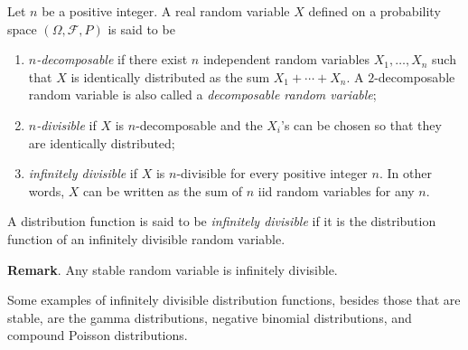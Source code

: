 \documentclass[12pt]{article}
\begin{document}
Let $n$ be a positive integer.  A real random variable $X$ defined on a probability space $(\Omega, \mathcal{F}, P)$ is said to be 
\begin{enumerate}
\item \emph{$n$-decomposable} if there exist $n$ independent random variables $X_1,\ldots,X_n$ such that $X$ is identically distributed as the sum $X_1+\cdots+X_n$.  A $2$-decomposable random variable is also called a \emph{decomposable random variable};
\item \emph{$n$-divisible} if $X$ is $n$-decomposable and the $X_i$'s can be chosen so that they are identically distributed;
\item \emph{infinitely divisible} if $X$ is $n$-divisible for every positive integer $n$.  In other words, $X$ can be written as the sum of $n$ iid random variables for any $n$.
\end{enumerate}

A distribution function is said to be \emph{infinitely divisible} if it is the distribution function of an infinitely divisible random variable.

\textbf{Remark}.  Any stable random variable is infinitely divisible.

Some examples of infinitely divisible distribution functions, besides those that are stable, are the gamma distributions, negative binomial distributions, and compound Poisson distributions.
\end{document}
